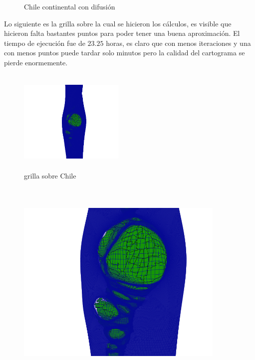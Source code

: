 \documentclass[20pt]{report}
\begin{document}
\begin{itemize}
\begin{figure}[H]
\begin{center}
\caption{Chile continental con difusi\'on}
\label{Label para referencia}
\end{center}
\end{figure}
Lo siguiente es la grilla sobre la cual se hicieron los c\'alculos, es visible que hicieron falta bastantes puntos para poder tener una buena aproximaci\'on. El tiempo de ejecuci\'on fue de $23.25$ horas, es claro que con menos iteraciones y una  con menos puntos puede tardar solo minutos pero la calidad del cartograma se pierde enormemente.
\begin{figure}[H]
\begin{center}
\includegraphics[width=5cm, height=5cm]{grilla.png}
\vspace{-0.5cm} %
\caption{grilla sobre Chile}
\label{Label para referencia}
\end{center}
\end{figure}
\begin{figure}[H]
\begin{center}
\includegraphics[width=10cm, height=10cm]{grillacentro.png}

\end{center}
\end{figure}
\end{itemize}
\end{document}
